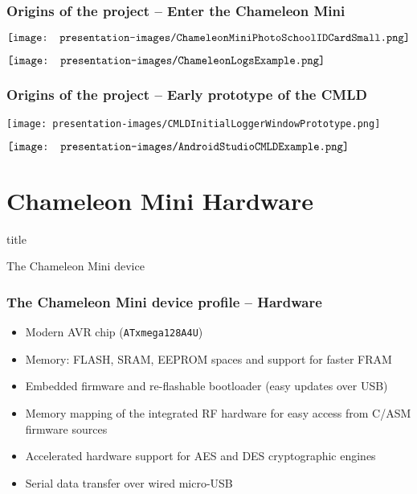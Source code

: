 \documentclass[usenames,svgnames,dvipsnames,11pt]{beamer}
\newcommand{\TitleBoxed}[1]{
     \begin{beamercolorbox}[sep=8pt,center,shadow=true,rounded=true]{title}
          \usebeamerfont{title}#1\par%
     \end{beamercolorbox}
}
\begin{document}
\begin{frame}
\frametitle{Origins of the project -- Enter the Chameleon Mini}

\bigskip
{}
\begin{center}
$\vcenter{\hbox{\texttt{[image: presentation-images/ChameleonMiniPhotoSchoolIDCardSmall.png]}}}$
\end{center}
\endminipage\hfil
{}
\begin{center}
$\vcenter{\hbox{\texttt{[image: presentation-images/ChameleonLogsExample.png]}}}$
\end{center}
\endminipage

\end{frame}

\begin{frame}
\frametitle{Origins of the project -- Early prototype of the CMLD}

\begin{center}
\texttt{[image: presentation-images/CMLDInitialLoggerWindowPrototype.png]}
\end{center}
\endminipage
{}
\begin{center}
$\vcenter{\hbox{\texttt{[image: presentation-images/AndroidStudioCMLDExample.png]}}}$
\end{center}
\endminipage

\end{frame}

\section{Chameleon Mini Hardware}

\begin{frame}
\TitleBoxed{
     \Huge{\centerline{The Chameleon Mini device}}
}
\end{frame}

\begin{frame}
\frametitle{The Chameleon Mini device profile -- Hardware}

\begin{itemize} 

\item Modern AVR chip (\texttt{ATxmega128A4U}) 
\item Memory: FLASH, SRAM, EEPROM spaces and support for faster FRAM
\item Embedded firmware and re-flashable bootloader (easy updates over USB)
\item Memory mapping of the integrated RF hardware for easy access from C/ASM firmware sources
\item Accelerated hardware support for AES and DES cryptographic engines
\item Serial data transfer over wired micro-USB 

\end{itemize} 

\end{frame}
\end{document}
